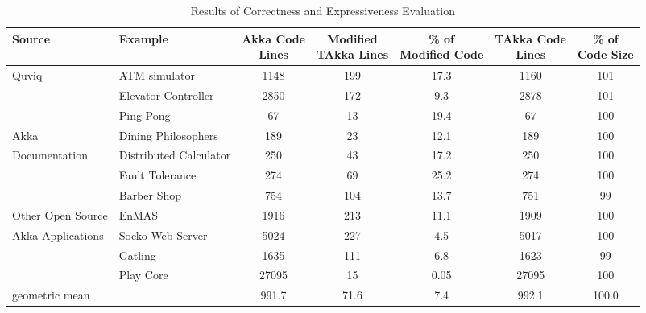 \begin{table}[t]
\begin{center}
\begin{tabular}{| p{2.7 cm} | p{3.3 cm} | c | c |  c | c | c |}
\hline

Source & Example & \specialcell{Akka Code \\ Lines} &
\specialcell{Modified\\ TAkka Lines} & \specialcell{\% of \\Modified Code} &
\specialcell{TAkka Code\\ Lines}
& \specialcell{\% of \\Code Size} \\
\hline
Quviq \citep{quviq}  & ATM simulator & 1148 & 199 & 17.3 & 1160 & 101 \\
\cline{2-7}
                                    & Elevator Controller &
2850 & 172 & 9.3 & 2878 & 101 \\
\hline


                                                               & Ping Pong & 67
& 13 & 19.4 & 67 & 100 \\
\cline{2-7}
Akka                 & Dining Philosophers & 189 & 23 & 12.1 &
189 & 100  \\
\cline{2-7}
Documentation\citep{akka_doc}             & Distributed Calculator  & 250 &
43 & 17.2 & 250 & 100 \\
\cline{2-7}
                                                     & Fault Tolerance & 274 &
69 & 25.2 & 274 & 100 \\
\hline

                                                    & Barber Shop \citep{BarberShop}& 754 & 104 & 
13.7 & 751 & 99 \\
\cline{2-7}
Other Open Source             & EnMAS \citep{EnMAS} & 1916 & 213 & 11.1 & 1909 &
100 \\
\cline{2-7}
  Akka Applications                & Socko Web Server \citep{SOCKO}  & 5024 & 227
& 4.5 & 5017 & 100 \\
\cline{2-7}
                                                     & Gatling \citep{Gatling}
& 1635 & 111 & 6.8 & 1623 & 99 \\
\cline{2-7}
                                                     & Play Core \citep{play_doc}
& 27095 & 15 & 0.05 & 27095 & 100 \\
\hline
geometric mean                   & & 991.7 & 71.6 & 7.4 & 992.1 & 100.0 \\
\hline
\end{tabular}
\caption{Results of Correctness and Expressiveness Evaluation}
\end{center}
\label{express}
\end{table}

